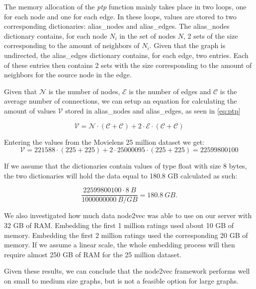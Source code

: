 The memory allocation of the \textit{ptp} function mainly takes place in two loops, one for each node and one for each edge.
In these loops, values are stored to two corresponding dictionaries: alias\_nodes and alias\_edges.
The alias\_nodes dictionary contains, for each node $N_i$ in the set of nodes $N$, 2 sets of the size corresponding to the amount of neighbors of $N_i$.
Given that the graph is undirected, the alias\_edges dictionary contains, for each edge, two entries. Each of these entries then contains 2 sets with the size corresponding to the amount of neighbors for the source node in the edge.

Given that $\mathcal{N}$ is the number of nodes, $\mathcal{E}$ is the number of edges and $\mathcal{C}$ is the average number of connections, we can setup an equation for calculating the amount of values $\mathcal{V}$ stored in alias\_nodes and alias\_edges, as seen in \autoref{eq:ptp}

\begin{equation}
  \label{eq:ptp}
  \mathcal{V} = \mathcal{N} \cdot (\mathcal{C} + \mathcal{C}) + 2 \cdot \mathcal{E} \cdot (\mathcal{C} + \mathcal{C})
\end{equation}

Entering the values from the Movielens 25 million dataset we get:
$$
\mathcal{V} = 221588 \cdot (225 + 225) + 2 \cdot 25000095 \cdot (225 + 225) = 22599800100
$$


If we assume that the dictionaries contain values of type float with size 8 bytes, the two dictionaries will hold the data equal to 180.8 GB calculated as such:

$$
  \frac{22599800100 \cdot 8 \ B}{1000000000 \ B/GB} = 180.8 \ GB.
$$

We also investigated how much data node2vec was able to use on our server with 32 GB of RAM. Embedding the first 1 million ratings used about 10 GB of memory. Embedding the first 2 million ratings used the corresponding 20 GB of memory. If we assume a linear scale, the whole embedding process will then require almost 250 GB of RAM for the 25 million dataset.

Given these results, we can conclude that the node2vec framework performs well on small to medium size graphs, but is not a feasible option for large graphs.


